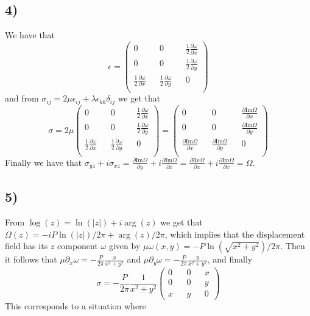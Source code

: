 \documentclass[10pt,a4paper]{book}
\begin{document}
\subsection*{4)}
We have that 
$$\epsilon=\begin{pmatrix}
0 && 0 && \frac{1}{2}\frac{\partial \omega}{\partial x}\\
0 && 0 && \frac{1}{2}\frac{\partial \omega}{\partial y}\\
\frac{1}{2}\frac{\partial \omega}{\partial x} && \frac{1}{2}\frac{\partial \omega}{\partial y} && 0\\
\end{pmatrix}$$
and from $\sigma_{ij}=2\mu\epsilon_{ij}+\lambda\epsilon_{kk}\delta_{ij}$ we get that 
$$
\sigma=2\mu\begin{pmatrix}
 0 && 0 && \frac{1}{2}\frac{\partial \omega}{\partial x}\\
0 && 0 && \frac{1}{2}\frac{\partial \omega}{\partial y}\\
\frac{1}{2}\frac{\partial \omega}{\partial x} && \frac{1}{2}\frac{\partial \omega}{\partial y} && 0\\
\end{pmatrix}=
\begin{pmatrix}
 0 && 0 && \frac{\partial\text{Im}\Omega}{\partial x}\\
0 && 0 && \frac{\partial\text{Im}\Omega}{\partial y}\\
\frac{\partial\text{Im}\Omega}{\partial x} && \frac{\partial\text{Im}\Omega}{\partial y} && 0\\
\end{pmatrix}$$
Finally we have that $\sigma_{yz}+i\sigma_{xz}=\frac{\partial\text{Im}\Omega}{\partial y}+i\frac{\partial\text{Im}\Omega}{\partial x}=\frac{\partial\text{Re}\Omega}{\partial x}+i\frac{\partial\text{Im}\Omega}{\partial x}=\Omega$.

\subsection*{5)}
From $\log(z)=\ln(|z|)+i\arg(z)$ we get that $\Omega(z)=-iP\ln(|z|)/2\pi+\arg(z)/2\pi$, which implies that the displacement field has its $z$ component $\omega$ given by $\mu\omega(x,y)=-P\ln(\sqrt{x^2+y^2})/2\pi$. Then it follows that $\mu\partial_x\omega=-\frac{P}{2\pi}\frac{x}{x^2+y^2}$ and $\mu\partial_y\omega=-\frac{P}{2\pi}\frac{y}{x^2+y^2}$, and finally
$$\sigma=-\frac{P}{2\pi}\frac{1}{x^2+y^2}\begin{pmatrix}
0 && 0 && x\\
0 && 0 && y\\
x && y && 0
\end{pmatrix}$$
This corresponds to a situation where 
\end{document}
